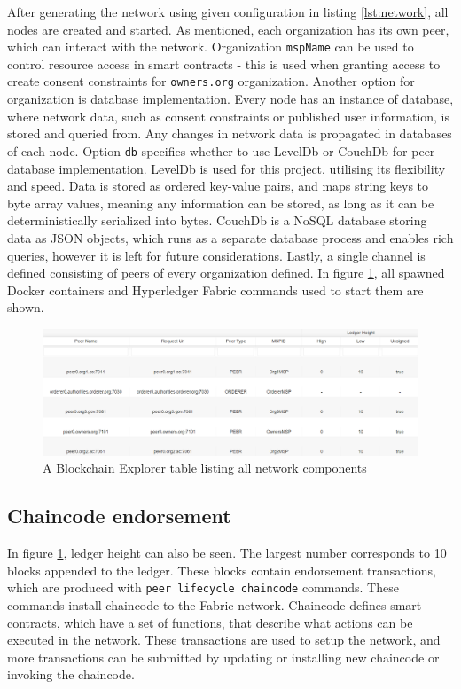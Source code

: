 \documentclass[12pt]{article}
\begin{document}
    After generating the network using given configuration in listing \ref{lst:network}, all nodes are created and started. As mentioned, each organization has its own peer, which can interact with the network. Organization \lstinline{mspName} can be used to control resource access in smart contracts - this is used when granting access to create consent constraints for \lstinline{owners.org} organization. Another option for organization is database implementation. Every node has an instance of database, where network data, such as consent constraints or published user information, is stored and queried from. Any changes in network data is propagated in databases of each node. Option \lstinline{db} specifies whether to use LevelDb or CouchDb for peer database implementation. LevelDb is used for this project, utilising its flexibility and speed. Data is stored as ordered key-value pairs, and maps string keys to byte array values, meaning any information can be stored, as long as it can be deterministically serialized into bytes. CouchDb is a NoSQL database storing data as JSON objects, which runs as a separate database process and enables rich queries, however it is left for future considerations. Lastly, a single channel is defined consisting of peers of every organization defined. In figure \ref{fig:network}, all spawned Docker containers and Hyperledger Fabric commands used to start them are shown.
    
    \begin{figure}[H]
        \includegraphics[width=\textwidth]{network.png}
        \caption{A Blockchain Explorer table listing all network components}
        \label{fig:network}
    \end{figure}


    \subsection{Chaincode endorsement}
    In figure \ref{fig:network}, ledger height can also be seen. The largest number corresponds to 10 blocks appended to the ledger. These blocks contain endorsement transactions, which are produced with \lstinline{peer lifecycle chaincode} commands. These commands install chaincode to the Fabric network. Chaincode defines smart contracts, which have a set of functions, that describe what actions can be executed in the network. These transactions are used to setup the network, and more transactions can be submitted by updating or installing new chaincode or invoking the chaincode.
    
\end{document}

